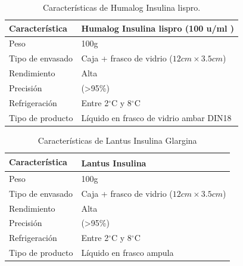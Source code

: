 \begin{enumerate}
\begin{table}[H]
	\centering
		\caption{Características de Humalog Insulina lispro. }\cite{lispro-2006}
	\begin{tabular}{ll}
	\toprule
		\textbf{Característica}     & \textbf{Humalog Insulina lispro (100  u/ml )} \\ \midrule
		Peso                        & 100g             \\ %
		Tipo de envasado            & Caja + frasco de vidrio ($12cm\times 3{.}5cm$)     \\ %
		Rendimiento                 & Alta                             \\%
		Precisión                   & (>95\%)                                 \\ %
		Refrigeración       &  Entre 2$^\circ$C y 8$^\circ$C                           \\%
		Tipo de producto & Líquido en frasco de vidrio ambar DIN18\\\bottomrule
	\end{tabular}
	\label{tabla:humalog}
\end{table}\rsp
\begin{table}[H]
	\centering
	\caption{Características de Lantus Insulina Glargina}\cite{lantus-2015}
	\begin{tabular}{ll}
	\toprule
	\textbf{Característica}     & \textbf{Lantus\textsuperscript{\textregistered} Insulina} \\ \midrule
	Peso                        & 100g             \\ %
	Tipo de envasado            & Caja + frasco de vidrio  ($12cm\times 3{.}5cm$)     \\ %
	Rendimiento                 & Alta                             \\%
	Precisión                   & (>95\%)                                 \\ %
	Refrigeración       &  Entre 2$^\circ$C y 8$^\circ$C                            \\%
	Tipo de producto & Líquido en frasco ampula\\ \bottomrule
\end{tabular}
	\label{tabla:lantus}
\end{table}
\newpage
\begin{multicols}{2}
 

\end{multicols}
\end{enumerate}
